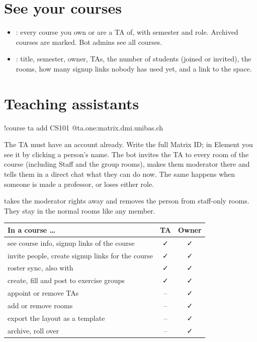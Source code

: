 \section{See your courses}

\begin{itemize}
  \item {}: every course you own or are a TA of, with semester and role.
        Archived courses are marked. Bot admins see all courses.
  \item {}: title, semester, owner, TAs, the number of students (joined
        or invited), the rooms, how many signup links nobody has used yet, and a link to the
        space.
\end{itemize}

\section{Teaching assistants}
\label{sec:tas}

\begin{you}
!course ta add CS101 @ta.one:matrix.dmi.unibas.ch
\end{you}

The TA must have an account already. Write the full Matrix ID; in Element you see it by
clicking a person's name. The bot invites the TA to every room of the course (including Staff
and the group rooms), makes them moderator there and tells them in a direct chat what they
can do now. The same happens when someone is made a professor, or loses either role.

 takes the moderator rights away and
removes the person from staff-only rooms. They stay in the normal rooms like any member.

\begin{center}
\begin{tabularx}{\textwidth}{@{}Lcc@{}}
\toprule
\textbf{In a course \dots} & \textbf{TA} & \textbf{Owner} \\
\midrule
see course info, signup links of the course & \faCheck & \faCheck \\
invite people, create signup links for the course & \faCheck & \faCheck \\
roster sync, also with  & \faCheck & \faCheck \\
create, fill and post to exercise groups & \faCheck & \faCheck \\
appoint or remove TAs & -- & \faCheck \\
add or remove rooms & -- & \faCheck \\
export the layout as a template & -- & \faCheck \\
archive, roll over & -- & \faCheck \\
\bottomrule
\end{tabularx}
\end{center}

